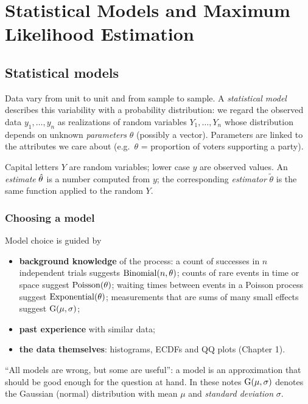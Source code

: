 \chapter{Statistical Models and Maximum Likelihood Estimation}

\section{Statistical models}

Data vary from unit to unit and from sample to sample. A \emph{statistical model}
describes this variability with a probability distribution: we regard the observed data
$y_1,\dots,y_n$ as realizations of random variables $Y_1,\dots,Y_n$ whose distribution
depends on unknown \emph{parameters} $\theta$ (possibly a vector). Parameters are linked
to the attributes we care about (e.g.\ $\theta$ = proportion of voters supporting a party).

\begin{remark}[Notation]
Capital letters $Y$ are random variables; lower case $y$ are observed values. An
\emph{estimate} $\hat{\theta}$ is a number computed from $y$; the corresponding
\emph{estimator} $\tilde\theta$ is the same function applied to the random $Y$.
\end{remark}

\subsection{Choosing a model}
Model choice is guided by
\begin{itemize}
  \item \textbf{background knowledge} of the process: a count of successes in $n$
        independent trials suggests $\operatorname{Binomial}(n,\theta)$; counts of rare events in time or
        space suggest $\operatorname{Poisson}(\theta)$; waiting times between events in a Poisson process
        suggest $\operatorname{Exponential}(\theta)$; measurements that are sums of many small effects
        suggest $\operatorname{G}(\mu,\sigma)$;
  \item \textbf{past experience} with similar data;
  \item \textbf{the data themselves}: histograms, ECDFs and QQ plots (Chapter 1).
\end{itemize}
``All models are wrong, but some are useful'': a model is an approximation that should be
good enough for the question at hand. In these notes $\operatorname{G}(\mu,\sigma)$ denotes the Gaussian
(normal) distribution with mean $\mu$ and \emph{standard deviation} $\sigma$.

